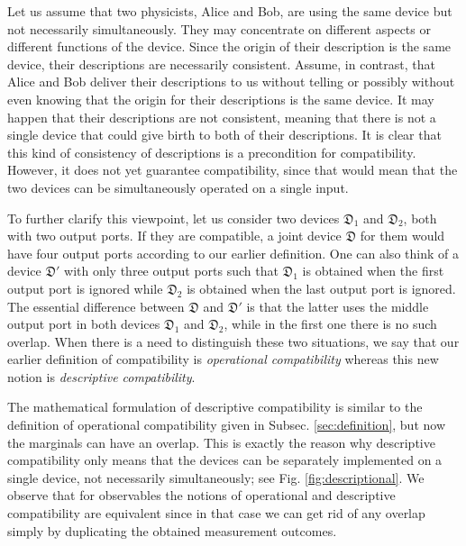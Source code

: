 \documentclass[12pt]{iopart}
\theoremstyle{definition}
\newcommand{\Dev}{\mathfrak{D}} %
\begin{document}
Let us assume that two physicists, Alice and Bob, are using the same device but not necessarily simultaneously.
They may concentrate on different aspects or different functions of the device.
Since the origin of their description is the same device, their descriptions are necessarily consistent.
Assume, in contrast, that Alice and Bob deliver their descriptions to us without telling or possibly without even knowing that the origin for their descriptions is the same device.
It may happen that their descriptions are not consistent, meaning that there is not a single device that could give birth to both of their descriptions.
It is clear that this kind of consistency of descriptions is a precondition for compatibility.
However, it does not yet guarantee compatibility, since that would mean that the two devices can be simultaneously operated on a single input.

To further clarify this viewpoint, let us consider two devices $\Dev_1$ and $\Dev_2$, both with two output ports. 
If they are compatible, a joint device $\Dev$ for them would have four output ports according to our earlier definition.
One can also think of a device $\Dev'$ with only three output ports such that $\Dev_1$ is obtained when the first output port is ignored while $\Dev_2$ is obtained when the last output port is ignored. 
The essential difference between $\Dev$ and $\Dev'$ is that the latter uses the middle output port in both devices $\Dev_1$ and $\Dev_2$, while in the first one there is no such overlap.
When there is a need to distinguish these two situations, we say that our earlier definition of compatibility is \emph{operational compatibility} whereas this new notion is \emph{descriptive compatibility}.

The mathematical formulation of descriptive compatibility is similar to the definition of operational compatibility given in Subsec. \ref{sec:definition}, but now the marginals can have an overlap. 
This is exactly the reason why descriptive compatibility only means that the devices can be separately implemented on a single device, not necessarily simultaneously; see Fig. \ref{fig:descriptional}.
We observe that for observables the notions of operational and descriptive compatibility are equivalent since in that case we can get rid of any overlap simply by duplicating the obtained measurement outcomes.
\end{document}
